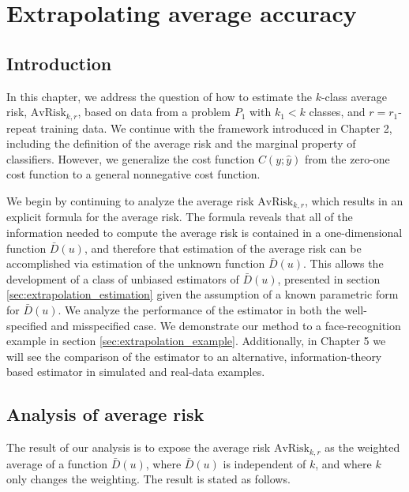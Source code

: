 
\chapter{Extrapolating average accuracy} %

\newcommand{\skone}{\mathcal{S}_{k_1}}
\newcommand{\sktwo}{\mathcal{S}_{k_2}}


\label{Chapter3} %

\section{Introduction}

In this chapter, we address the question of how to estimate the
$k$-class average risk, $\text{AvRisk}_{k, r}$, based on data from a
problem $P_1$ with $k_1 < k$ classes, and $r = r_1$-repeat training
data.  We continue with the framework introduced in Chapter 2,
including the definition of the average risk and the marginal property
of classifiers.  However, we generalize the cost function $C(y;
\hat{y})$ from the zero-one cost function to a general nonnegative cost function.

We begin by continuing to analyze the average risk $\text{AvRisk}_{k,
  r}$, which results in an explicit formula for the average risk.  The
formula reveals that all of the information needed to compute the
average risk is contained in a one-dimensional function $\bar{D}(u)$,
and therefore that estimation of the average risk can be accomplished
via estimation of the unknown function $\bar{D}(u)$.  This allows the
development of a class of unbiased estimators of $\bar{D}(u)$,
presented in section \ref{sec:extrapolation_estimation} given the
assumption of a known parametric form for $\bar{D}(u)$.  We analyze
the performance of the estimator in both the well-specified and
misspecified case.  We demonstrate our method to a face-recognition
example in section \ref{sec:extrapolation_example}.  Additionally, in
Chapter 5 %
we will see the
comparison of the estimator to an alternative, information-theory
based estimator in simulated and real-data examples.

\section{Analysis of average risk}

The result of our analysis is to expose the average risk
$\text{AvRisk}_{k, r}$ as the weighted average of a function
$\bar{D}(u)$, where $\bar{D}(u)$ is independent of $k$, and where $k$
only changes the weighting.  The result is stated as follows.

